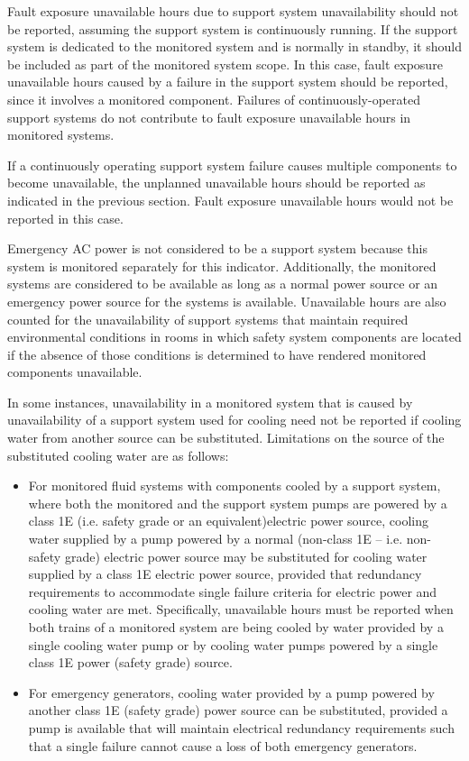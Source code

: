 Fault exposure unavailable hours due to support system unavailability
should not be reported, assuming the support system is continuously
running. If the support system is dedicated to the monitored system
and is normally in standby, it should be included as part of the
monitored system scope. In this case, fault exposure unavailable hours
caused by a failure in the support system should be reported, since it
involves a monitored component. Failures of continuously-operated
support systems do not contribute to fault exposure unavailable hours
in monitored systems.

If a continuously operating support system failure causes multiple
components to become unavailable, the unplanned unavailable hours
should be reported as indicated in the previous section.  Fault
exposure unavailable hours would not be reported in this case.

Emergency AC power is not considered to be a support system because this system is monitored separately for this indicator. Additionally, the monitored systems are considered to be available as long as a normal power source or an emergency power source for the systems is available.
Unavailable hours are also counted for the unavailability of support
systems that maintain required environmental conditions in rooms in
which safety system components are located if the absence of those
conditions is determined to have rendered monitored components
unavailable.

In some instances, unavailability in a monitored system that is caused
by unavailability of a support system used for cooling need not be
reported if cooling water from another source can be
substituted. Limitations on the source of the substituted cooling
water are as follows:
\begin{itemize}
\item For monitored fluid systems with components cooled by a support system, where both the monitored and the support system pumps are powered by a class 1E (i.e. safety grade or an equivalent)electric power source, cooling water supplied by a pump powered by a normal (non-class 1E – i.e. non-safety grade) electric power source may be substituted for cooling water supplied by a class 1E electric power source, provided that redundancy requirements to accommodate single failure criteria for electric power and cooling water are met. Specifically, unavailable hours must be reported when both trains of a monitored system are being cooled by water provided by a single cooling water pump or by cooling water pumps powered by a single class 1E power (safety grade) source.
\item For emergency generators, cooling water provided by a pump
  powered by another class 1E (safety grade) power source can be
  substituted, provided a pump is available that will maintain
  electrical redundancy requirements such that a single failure cannot
  cause a loss of both emergency generators.
\end{itemize}

